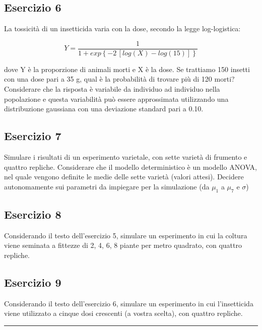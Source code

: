 \documentclass[a4paper,12pt,oneside]{book}
\begin{document}
\hypertarget{esercizio-6}{%
\subsection{Esercizio 6}\label{esercizio-6}}

La tossicità di un insetticida varia con la dose, secondo la legge log-logistica:

\[ Y = \frac{1}{1 + exp\left\{ -2 \, \left[log(X) - log(15)\right] \right\}}\]

dove Y è la proporzione di animali morti e X è la dose. Se trattiamo 150 insetti con una dose pari a 35 g, qual è la probabilità di trovare più di 120 morti? Considerare che la risposta è variabile da individuo ad individuo nella popolazione e questa variabilità può essere approssimata utilizzando una distribuzione gaussiana con una deviazione standard pari a 0.10.

\hypertarget{esercizio-7}{%
\subsection{Esercizio 7}\label{esercizio-7}}

Simulare i risultati di un esperimento varietale, con sette varietà di frumento e quattro repliche. Considerare che il modello deterministico è un modello ANOVA, nel quale vengono definite le medie delle sette varietà (valori attesi). Decidere autonomamente sui parametri da impiegare per la simulazione (da \(\mu_1\) a \(\mu_7\) e \(\sigma\))

\hypertarget{esercizio-8}{%
\subsection{Esercizio 8}\label{esercizio-8}}

Considerando il testo dell'esercizio 5, simulare un esperimento in cui la coltura viene seminata a fittezze di 2, 4, 6, 8 piante per metro quadrato, con quattro repliche.

\hypertarget{esercizio-9}{%
\subsection{Esercizio 9}\label{esercizio-9}}

Considerando il testo dell'esercizio 6, simulare un esperimento in cui l'insetticida viene utilizzato a cinque dosi crescenti (a vostra scelta), con quattro repliche.

\begin{center}\rule{0.5\linewidth}{0.5pt}\end{center}
\end{document}
